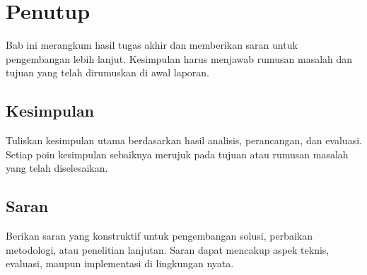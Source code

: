 %
%
%
%
%

\chapter{Penutup}

Bab ini merangkum hasil tugas akhir dan memberikan saran untuk
pengembangan lebih lanjut. Kesimpulan harus menjawab rumusan masalah
dan tujuan yang telah dirumuskan di awal laporan.

\section{Kesimpulan}

Tuliskan kesimpulan utama berdasarkan hasil analisis, perancangan,
dan evaluasi. Setiap poin kesimpulan sebaiknya merujuk pada tujuan
atau rumusan masalah yang telah diselesaikan.

\blindtext%

\section{Saran}

Berikan saran yang konstruktif untuk pengembangan solusi, perbaikan
metodologi, atau penelitian lanjutan. Saran dapat mencakup aspek
teknis, evaluasi, maupun implementasi di lingkungan nyata.

\blindtext%
